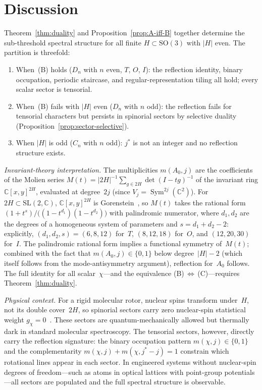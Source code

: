 \documentclass[12pt]{article}
\theoremstyle{definition}
\theoremstyle{remark}
\newcommand{\CC}{\mathbb{C}}
\newcommand{\SO}{\mathrm{SO}}
\DeclareMathOperator{\Sym}{Sym}
\newcommand{\SL}{\mathrm{SL}}
\begin{document}
\section{Discussion}
\label{sec:discussion}

Theorem~\ref{thm:duality} and Proposition~\ref{prop:A-iff-B}
together determine the sub-threshold spectral structure
for all finite $H \subset \SO(3)$ with $|H|$ even.
The partition is threefold:
\begin{enumerate}
\item[(i)] When~(B) holds ($D_n$ with $n$ even, $T$, $O$, $I$):
  the reflection identity, binary occupation, periodic
  staircase, and regular-representation tiling all hold;
  every scalar sector is tensorial.
\item[(ii)] When~(B) fails with $|H|$ even ($D_n$ with
  $n$ odd): the reflection fails for tensorial characters
  but persists in spinorial sectors by selective duality
  (Proposition~\ref{prop:sector-selective}).
\item[(iii)] When $|H|$ is odd ($C_n$ with $n$ odd):
  $j^*$ is not an integer and no reflection structure exists.
\end{enumerate}

\emph{Invariant-theory interpretation.}
The multiplicities $m(A_0, j)$ are the
coefficients of the Molien series
$M(t) = |2H|^{-1} \sum_{g \in 2H} \det(I - tg)^{-1}$
of the invariant ring $\CC[x,y]^{2H}$, evaluated at
degree~$2j$ (since $V_j = \Sym^{2j}(\CC^2)$).
For $2H \subset \SL(2,\CC)$,
$\CC[x,y]^{2H}$ is Gorenstein~\cite{Watanabe1974},
so $M(t)$ takes the rational form
$(1 + t^s)/\bigl((1-t^{d_1})(1-t^{d_2})\bigr)$
with palindromic numerator,
where $d_1, d_2$ are the degrees of a homogeneous system
of parameters and $s = d_1 + d_2 - 2$:
explicitly, $(d_1,d_2,s) = (6,8,12)$ for~$T$,
$(8,12,18)$ for~$O$, and $(12,20,30)$ for~$I$.
The palindromic rational form implies a functional symmetry
of~$M(t)$; combined with the fact that $m(A_0, j) \in \{0,1\}$
below degree~$|H| - 2$ (which itself follows from the
mode-antisymmetry argument), reflection for~$A_0$ follows.
The full identity for all scalar~$\chi$---and the equivalence
(B)$\,\Leftrightarrow\,$(C)---requires
Theorem~\ref{thm:duality}.

\emph{Physical context.}
For a rigid molecular rotor, nuclear spins transform
under~$H$, not its double cover~$2H$, so spinorial
sectors carry zero nuclear-spin statistical weight
$g_\chi = 0$~\cite{BunkerJensen2006}.
These sectors are quantum-mechanically allowed but
thermally dark in standard molecular spectroscopy.
The tensorial sectors, however, directly carry the
reflection signature: the binary occupation pattern
$m(\chi,j) \in \{0,1\}$ and the complementarity
$m(\chi,j) + m(\chi,j^*{-}j) = 1$ constrain which
rotational lines appear in each sector.
In engineered systems without nuclear-spin degrees of
freedom---such as atoms in optical lattices with
point-group potentials---all sectors are populated
and the full spectral structure is observable.
\end{document}
